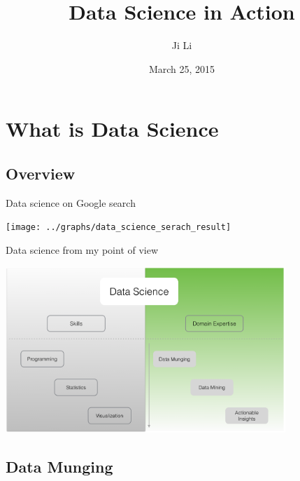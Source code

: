 \documentclass[10pt]{beamer}
\title[Data Science In Action]{Data Science in Action}
\author[JL]{Ji Li}
\institute[Ji Li]{Data Scientist}
\date{March 25, 2015}
\begin{document}
\frame{\titlepage}


\section{What is Data Science}

  \subsection{Overview}

    \begin{frame}{Data science on Google search}
      \begin{center}
        \texttt{[image: ../graphs/data\_science\_serach\_result]}
      \end{center}
    \end{frame}

    \begin{frame}{Data science from my point of view}
      \begin{center}
        \includegraphics[width=300pt]{../graphs/data_science_structure}
      \end{center}
    \end{frame}

  \subsection{Data Munging}
  
\end{document}

